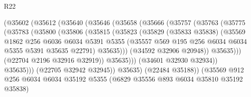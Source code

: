\begin{lexlean}{R22}
\begin{coremodule}
                        (@35602
                          (@35612
                            (@35640
                              (@35646
                                (@35658
                                  (@35666
                                    (@35757
                                      (@35763
                                        (@35775
                                          (@35783
                                            (@35800
                                              (@35806
                                                (@35815
                                                  (@35823
                                                    (@35829
                                                      (@35833 @35838)
                                                      (@35569
                                                        @1862
                                                        @256
                                                        @6036
                                                        @6034
                                                        @5391
                                                        @5355
                                                        (@35557
                                                          @569
                                                          @195
                                                          @256
                                                          @6034
                                                          @6034
                                                          @5355
                                                          @5391
                                                          @35635
                                                          @22791)
                                                        @35635)))
                                                  (@34592 @32906 @20948))
                                                @35635)))
                                          (@22704 @2196 @32916 @32919))
                                        @35635)))
                                  (@34601 @32930 @32934))
                                @35635)))
                          (@22705 @32942 @32945))
                        @35635)
                      (@22484 @35188))
                    (@35569
                      @912
                      @256
                      @6034
                      @6034
                      @35192
                      @5355
                      (@6829 @35556 @893 @6034 @35810 @35192 @35838)

\end{coremodule}
\end{lexlean}
